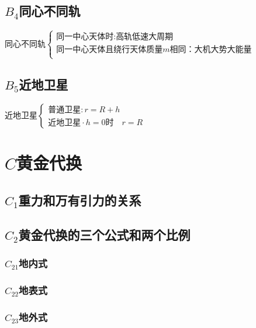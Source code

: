 \documentclass[lang=cn,10pt]{elegantbook}
\begin{document}
	       \subsection{$ B_4$同心不同轨}
	       $\text{同心不同轨}\left\{ \begin{array}{l}
	       	\text{同一中心天体时}:\text{高轨低速大周期}\\
	       	\text{同一中心天体且绕行天体质量}m\text{相同：大机大势大能量}\\
	       \end{array} \right. $
	       \subsection{$B_5$近地卫星}
	       $\text{近地卫星}\begin{cases}\text{普通卫星}:r=R+h\\\text{近地卫星}\cdot h=0\text{时}\quad r=R\end{cases}$
	       \section{$C$黄金代换}
	       \subsection{$C_1$重力和万有引力的关系}
	       \vspace{3cm}
	       
	       \subsection{$C_2$黄金代换的三个公式和两个比例}
	       \subsubsection{$C_{21}$地内式}
	       
	       \vspace{1cm}
	       
	       \subsubsection{$C_{22}$地表式}
	       
	       \vspace{1cm}
	       
	       \subsubsection{$C_{23}$地外式}
	       
\end{document}
